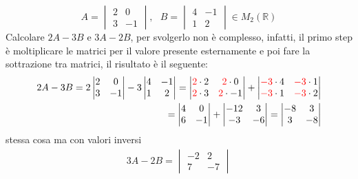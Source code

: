 \documentclass{book}
\begin{document}
\begin{equation}
  \label{eq:es1}
  A=
  \begin{vmatrix}
    2 & 0 \\
    3 & -1
  \end{vmatrix}, \text{ } B=
  \begin{vmatrix}
    4 & -1\\
    1 & 2
  \end{vmatrix} \in M_2(\mathds{R})
\end{equation}
Calcolare $2A-3B$ e $3A-2B$, per svolgerlo non è complesso, infatti, il primo
step è moltiplicare le matrici per il valore presente esternamente e poi fare
la sottrazione tra matrici, il risultato è il seguente:
\begin{eqnarray*}
  \label{eq:es1_sv}
  2A-3B = 2 \begin{vmatrix}
    2 & 0 \\
    3 & -1
  \end{vmatrix} - 3\begin{vmatrix}
    4 & -1\\
    1 & 2
  \end{vmatrix}=\begin{vmatrix}
    {\color{red}2}\cdot2 & {\color{red}2}\cdot0 \\
    {\color{red}2}\cdot3 & {\color{red}2}\cdot-1
  \end{vmatrix} +\begin{vmatrix}
    {\color{red}-3}\cdot4 & {\color{red}-3}\cdot1\\
    {\color{red}-3}\cdot1 & {\color{red}-3}\cdot2
                 \end{vmatrix}\\
  =
  \begin{vmatrix}
    4 &0\\
    6 &-1
  \end{vmatrix} +
  \begin{vmatrix}
    -12 & 3\\
    -3 &-6
  \end{vmatrix}=
  \begin{vmatrix}
    -8 & 3\\
    3 & -8
  \end{vmatrix}
\end{eqnarray*}
stessa cosa ma con valori inversi 
\begin{eqnarray*}
  3A-2B=
  \begin{vmatrix}
    -2 & 2 \\
    7 & -7
  \end{vmatrix}
\end{eqnarray*}
\end{document}
